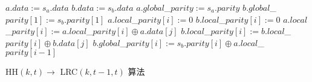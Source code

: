 \begin{algorithm}[tb!]
	\begin{algorithmic}[1]
		\setlength{\commentindent}{.3\textwidth}
		\setlength{\algorithmicindent}{1.5em}
		\renewcommand{\algorithmiccomment}[1]{\unskip\hfill\makebox[\commentindent][l]{$\rhd$~#1}\par}
		\LetLtxMacro{\oldalgorithmic}{\algorithmic}
		\renewcommand{\algorithmic}[1][0]{
			\oldalgorithmic[#1]
			\renewcommand{\ALC@com}[1]{
				\IFnum\pdfstrcmp{##1}{default}=0\ELSE\algorithmiccomment{##1}\fi}%
		}
        \STATE $a.data := s_a.data$
        \STATE $b.data := s_b.data$
        \STATE $a.global$\_$parity := s_a.parity$
        \STATE $b.global$\_$parity[1] := s_b.parity[1]$
        \STATE $a.local$\_$parity[i] := 0$
        \STATE $b.local$\_$parity[i] := 0$
                \STATE $a.local$\_$parity[i] := a.local$\_$parity[i] \oplus a.data[j]$
                \STATE $b.local$\_$parity[i] := b.local$\_$parity[i] \oplus b.data[j]$
            \ENDFOR
        \ENDFOR
            \STATE $b.global$\_$parity[i] := s_b.parity[i] \oplus a.local$\_$parity[i-1]$
        \ENDFOR
	\end{algorithmic}
	\caption{HH$(k,t) \rightarrow$ LRC$(k,t-1,t) $ 算法}
	\label{alg:4-3}
\end{algorithm}
